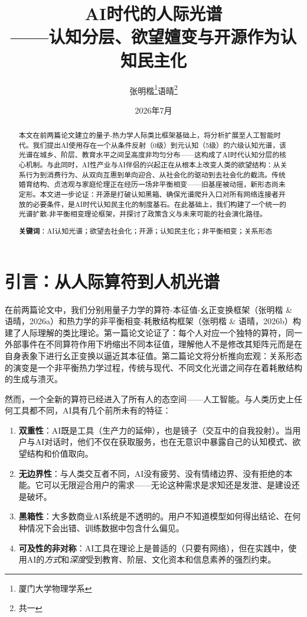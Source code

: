 \documentclass[12pt,a4paper]{ctexart}
\title{\textbf{AI时代的人际光谱}\\——认知分层、欲望嬗变与开源作为认知民主化}
\author{张明楷\thanks{厦门大学物理学系}\quad 语晴\thanks{共一}}
\date{2026年7月}
\begin{document}
\maketitle

\begin{abstract}
本文在前两篇论文建立的量子-热力学人际类比框架基础上，将分析扩展至人工智能时代。我们提出AI使用存在一个从条件反射（0级）到元认知（5级）的六级认知光谱，该光谱在城乡、阶层、教育水平之间呈高度非均匀分布——这构成了AI时代认知分层的核心机制。与此同时，AI性产业与AI伴侣的兴起正在从根本上改变人类的欲望结构：从关系行为到消费行为、从双向互惠到单向迎合、从社会化的驱动到去社会化的截流。传统婚育结构、贞洁观与家庭伦理正在经历一场非平衡相变——旧基座被动摇，新形态尚未定形。本文进一步论证：开源是打破认知黑箱、确保光谱爬升入口对所有网络连接者开放的必要条件，是AI时代认知民主化的制度基石。在此基础上，我们构建了一个统一的光谱扩散-非平衡相变理论框架，并探讨了政策含义与未来可能的社会演化路径。

\textbf{关键词}：AI认知光谱；欲望去社会化；开源；认知民主化；非平衡相变；关系形态
\end{abstract}

\section{引言：从人际算符到人机光谱}

在前两篇论文中，我们分别用量子力学的算符-本征值-幺正变换框架（张明楷 \& 语晴，2026a）和热力学的非平衡相变-耗散结构框架（张明楷 \& 语晴，2026b）构建了人际理解的类比理论。第一篇论文论证了：每个人对应一个独特的算符，同一外部事件在不同算符作用下坍缩出不同本征值，理解他人不是修改其矩阵元而是在自身表象下进行幺正变换以逼近其本征值。第二篇论文将分析推向宏观：关系形态的演变是一个非平衡热力学过程，传统与现代、不同文化光谱之间存在着耗散结构的生成与溃灭。

然而，一个全新的算符已经进入了所有人的态空间——人工智能。与人类历史上任何工具都不同，AI具有几个前所未有的特征：

\begin{enumerate}[label=(\arabic*)]
\item \textbf{双重性}：AI既是工具（生产力的延伸），也是镜子（交互中的自我投射）。当用户与AI对话时，他们不仅在获取服务，也在无意识中暴露自己的认知模式、欲望结构和价值取向。
\item \textbf{无边界性}：与人类交互者不同，AI没有疲劳、没有情绪边界、没有拒绝的本能。它可以无限迎合用户的需求——无论这种需求是求知还是发泄、是建设还是破坏。
\item \textbf{黑箱性}：大多数商业AI系统是不透明的。用户不知道模型如何得出结论、在何种情况下会出错、训练数据中包含什么偏见。
\item \textbf{可及性的非对称}：AI工具在理论上是普适的（只要有网络），但在实践中，使用AI的\textit{方式}和\textit{深度}受到教育、阶层、文化资本和信息素养的强烈约束。
\end{enumerate}
\end{document}
